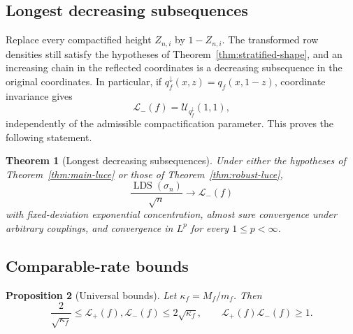 \documentclass[11pt]{article}
\newtheorem{theorem}{Theorem}[section]
\newtheorem{proposition}[theorem]{Proposition}
\theoremstyle{remark}
\newcommand{\LDS}{\operatorname{LDS}}
\newcommand{\calL}{\mathcal L}
\newcommand{\calU}{\mathcal U}
\begin{document}
\subsection{Longest decreasing subsequences}

Replace every compactified height $Z_{n,i}$ by $1-Z_{n,i}$.  The transformed
row densities still satisfy the hypotheses of
Theorem~\ref{thm:stratified-shape}, and an increasing chain in the reflected
coordinates is a decreasing subsequence in the original coordinates.
In particular, if $q_f^\downarrow(x,z)=q_f(x,1-z)$, coordinate invariance gives
\begin{equation}\label{eq:Lminus-compactified}
        \calL_-(f)=\calU_{q_f^\downarrow}(1,1),
\end{equation}
independently of the admissible compactification parameter.  This proves the
following statement.

\begin{theorem}[Longest decreasing subsequences]\label{thm:lds}
Under either the hypotheses of Theorem~\ref{thm:main-luce} or those of
Theorem~\ref{thm:robust-luce},
\begin{equation}\label{eq:lds-conv}
        \frac{\LDS(\sigma_n)}{\sqrt n}
        \longrightarrow\calL_-(f)
\end{equation}
with fixed-deviation exponential concentration, almost sure convergence under
arbitrary couplings, and convergence in $L^p$ for every $1\le p<\infty$.
\end{theorem}

\subsection{Comparable-rate bounds}

\begin{proposition}[Universal bounds]\label{prop:universal-bounds}
Let $\kappa_f=M_f/m_f$.  Then
\begin{equation}\label{eq:universal-bounds}
        \frac2{\sqrt{\kappa_f}}
        \le \calL_+(f),\calL_-(f)
        \le2\sqrt{\kappa_f},
        \qquad
        \calL_+(f)\calL_-(f)\ge1.
\end{equation}
\end{proposition}
\end{document}
